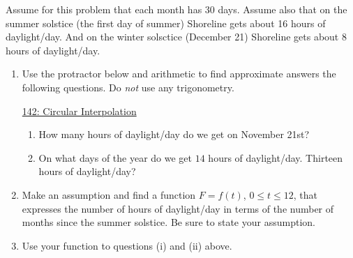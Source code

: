 \documentclass{ximera}
\begin{document}
\begin{exercise} \label{EPODRerDFGe}
Assume for this problem that each month has 30 days. Assume also that on the summer solstice (the first day of summer) Shoreline gets about 16 hours of daylight/day. And on the winter solsctice (December 21) Shoreline gets about $8$ hours of daylight/day.


\begin{enumerate}
\item Use the protractor below and arithmetic to find approximate answers the following questions. Do \emph{not} use any trigonometry.

\begin{onlineOnly}
    \begin{center}
\end{center}
\end{onlineOnly}

\href{https://www.desmos.com/calculator/nfsifbppzz}{142: Circular Interpolation}

\begin{enumerate}
\item How many hours of daylight/day do we get on November 21st?

\item On what days of the year do we get $14$ hours of daylight/day. Thirteen hours of daylight/day?
\end{enumerate}

\item Make an assumption and find a function $F=f(t)$, $0\leq t \leq 12$, that expresses the number of hours of daylight/day in terms of the number of months since the summer solstice. Be sure to state your assumption.

\item Use your function to questions  (i) and (ii) above.

\end{enumerate}
\end{exercise}
\end{document}
